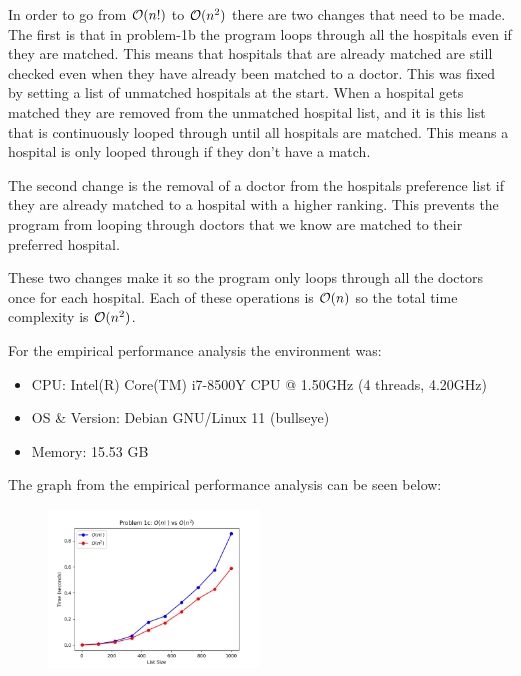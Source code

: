 \documentclass{hw}
\begin{document}
\begin{problem}
    \begin{solution}
        In order to go from $\mathcal{O}(n!)$ to $\mathcal{O}(n^2)$ there are two changes that need to be made. The first is that in problem-1b the program loops through all the hospitals even if they are matched. This means that hospitals that are already matched are still checked even when they have already been matched to a doctor. This was fixed by setting a list of unmatched hospitals at the start. When a hospital gets matched they are removed from the unmatched hospital list, and it is this list that is continuously looped through until all hospitals are matched. This means a hospital is only looped through if they don't have a match.
        
        The second change is the removal of a doctor from the hospitals preference list if they are already matched to a hospital with a higher ranking. This prevents the program from looping through doctors that we know are matched to their preferred hospital.
        
        These two changes make it so the program only loops through all the doctors once for each hospital. Each of these operations is $\mathcal{O}(n)$ so the total time complexity is $\mathcal{O}(n^2)$.
    
        For the empirical performance analysis the environment was:
        \begin{itemize}
            \item CPU: Intel(R) Core(TM) i7-8500Y CPU @ 1.50GHz (4 threads, 4.20GHz)
            \item OS \& Version: Debian GNU/Linux 11 (bullseye)
            \item Memory: 15.53 GB
        \end{itemize}
            
        The graph from the empirical performance analysis can be seen below:
        \begin{figure}[ht]
          \centering
              \includegraphics[width=0.5\textwidth]{figures/problem-1c.png}
        \end{figure}
    \end{solution}
\end{problem}
\end{document}
